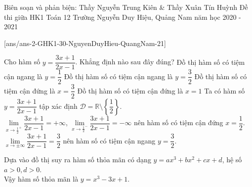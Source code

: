 \begin{name}
    {Biên soạn và phản biện: Thầy Nguyễn Trung Kiên \& Thầy Xuân Tín Huỳnh}
    {Đề thi giữa HK1 Toán 12 Trường Nguyễn Duy Hiệu, Quảng Nam năm học 2020 - 2021}
\end{name}
	\setcounter{ex}{0}\setcounter{bt}{0}
[ans/ans-2-GHK1-30-NguyenDuyHieu-QuangNam-21]
\begin{ex}%
Cho hàm số $y=\dfrac{3x+1}{2x-1}$. Khẳng định nào sau đây đúng?
	\choice
	{Đồ thị hàm số có tiệm cận ngang là $y=\dfrac{1}{2}$}
	{\True Đồ thị hàm số có tiệm cận ngang là $y=\dfrac{3}{2}$}
	{Đồ thị hàm số có tiệm cận đứng là $x=\dfrac{3}{2}$}
	{Đồ thị hàm số có tiệm cận đứng là $x=1$}
	\loigiai
	{Ta có hàm số $y=\dfrac{3x+1}{2x-1}$ tập xác định $\mathscr{D}=\mathbb{R}\setminus\left\lbrace \dfrac{1}{2}\right\rbrace $.
	\\
	$\lim\limits_{x\rightarrow \frac{1}{2}^+} \dfrac{3x+1}{2x-1}=+\infty$, $\lim\limits_{x\rightarrow \frac{1}{2}^-} \dfrac{3x+1}{2x-1}=-\infty$ nên hàm số có tiệm cận đứng $x=\dfrac{1}{2}$.
	\\
$\lim\limits_{x\rightarrow \pm\infty} \dfrac{3x+1}{2x-1}=\dfrac{3}{2}$ nên hàm số có tiệm cận ngang $y=\dfrac{3}{2}$.
}
\end{ex}

\begin{ex}%

	\loigiai
	{Dựa vào đồ thị suy ra hàm số thỏa mãn có dạng $y=ax^3+bx^2+cx+d$, hệ số $a>0,d>0$.\\
		Vậy hàm số thỏa mãn là $y=x^3-3x+1$.}
\end{ex}


